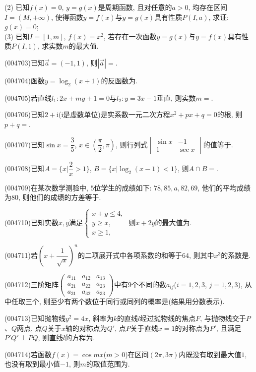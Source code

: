 (2)	已知$f(x)=0$, $y=g(x)$是周期函数, 且对任意的$a>0$, 均存在区间$I=(M,+\infty)$, 使得函数$y=f(x)$与$y=g(x)$具有性质$P(I,a)$, 求证: $g(x)=0$;\\
(3)	已知$I=[1,m]$, $f(x)=x^2$, 若存在一次函数$y=g(x)$与$y=f(x)$具有性质$P(I,1)$, 求实数$m$的最大值.
\item (004703)已知$\overrightarrow a = (-1,1)$, 则$|\overrightarrow a|=$.
\item (004704)函数$y=\log_2(x+1)$的反函数为.
\item (004705)若直线$l_1:2x+my+1=0$与$l_2:y=3x-1$垂直, 则实数$m=$.
\item (004706)已知$2+\mathrm{i}$($\mathrm{i}$是虚数单位)是实系数一元二次方程$x^2+px+q=0$的根, 则$p+q=$.
\item (004707)已知$\sin x=\dfrac{3}{5}$, $x\in (\dfrac \pi 2,\pi)$, 则行列式$\begin{vmatrix}   \sin x & -1 \\ 1 & \sec x \end{vmatrix}$的值等于.
\item (004708)已知$A=\{x|\dfrac 2 x>1\}$, $B=\{x|\log_2 (x-1)<1\}$, 则$A\cap B=$.
\item (004709)在某次数学测验中, $5$位学生的成绩如下: $78,85,a,82,69$, 他们的平均成绩为$80$, 则他们的成绩的方差等于.
\item (004710)已知实数$x,y$满足$\begin{cases}x+y\le 4, \\ y\ge x, \\ x\ge 1,\end{cases}$ 则$x+2y$的最大值为.
\item (004711)若$(x+\dfrac 1{\sqrt{x}})^n$的二项展开式中各项系数的和等于$64$, 则其中$x^3$的系数是.
\item (004712)三阶矩阵$\begin{pmatrix}
    a_{11} & a_{12} & a_{13} \\ a_{21} & a_{22} & a_{23} \\ a_{31} & a_{32} & a_{33}
\end{pmatrix}$中有$9$个不同的数$a_{ij}$($i=1,2,3$, $j=1,2,3$), 从中任取三个, 则至少有两个数位于同行或同列的概率是(结果用分数表示).
\item (004713)已知抛物线$y^2=4x$, 斜率为$k$的直线$l$经过抛物线的焦点$F$, 与抛物线交于$P$、$Q$两点, 点$Q$关于$x$轴的对称点为$Q'$, 点$P$关于直线$x=1$的对称点为$P'$, 且满足$P'Q'\perp PQ$, 则直线$l$的方程为.
\item (004714)若函数$f(x)=\cos mx$($m>0$)在区间$(2\pi,3\pi)$内既没有取到最大值$1$, 也没有取到最小值$-1$, 则$m$的取值范围为.
